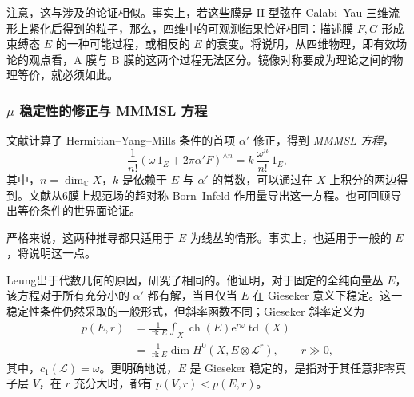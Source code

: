 注意，这与涉及的论证相似。事实上，若这些膜是 II 型弦在 Calabi--Yau 三维流形上紧化后得到的粒子，那么，四维中的可观测结果恰好相同：描述膜 $F,G$ 形成束缚态 $E$ 的一种可能过程，或相反的 $E$ 的衰变。将说明，从四维物理，即有效场论的观点看，A 膜与 B 膜的这两个过程无法区分。镜像对称要成为理论之间的物理等价，就必须如此。

\subsubsection{\texorpdfstring{$\mu$}{mu} 稳定性的修正与 MMMSL 方程}\label{sec:5.2.2.2}

文献计算了 Hermitian--Yang--Mills 条件的首项 $\alpha'$ 修正，得到 \emph{MMMSL 方程}，
\begin{equation}\label{eq:5.38}
\frac{1}{n!}(\omega\,1_E+2\pi\alpha'F)^{\wedge n}
=k\,\frac{\omega^n}{n!}\,1_E,
\end{equation}
其中，$n=\dim_{\mathbb C}X$，$k$ 是依赖于 $E$ 与 $\alpha'$ 的常数，可以通过在 $X$ 上积分的两边得到。文献从6膜上规范场的超对称 Born--Infeld 作用量导出这一方程。也可回顾导出等价条件的世界面论证。

严格来说，这两种推导都只适用于 $E$ 为线丛的情形。事实上，也适用于一般的 $E$，将说明这一点。

Leung出于代数几何的原因，研究了相同的。他证明，对于固定的全纯向量丛 $E$，该方程对于所有充分小的 $\alpha'$ 都有解，当且仅当 $E$ 在 Gieseker 意义下稳定。这一稳定性条件仍然采取的一般形式，但斜率函数不同；Gieseker 斜率定义为
\begin{equation}\label{eq:5.39}
\begin{aligned}
p(E,r)&=\frac{1}{\operatorname{rk}E}\int_X
\operatorname{ch}(E)\mathrm{e}^{r\omega}\operatorname{td}(X)\\
&=\frac{1}{\operatorname{rk}E}\dim H^0(X,E\otimes\mathcal{L}^r),\qquad r\gg0,
\end{aligned}
\end{equation}
其中，$c_1(\mathcal{L})=\omega$。更明确地说，$E$ 是 Gieseker 稳定的，是指对于其任意非零真子层 $V$，在 $r$ 充分大时，都有 $p(V,r)<p(E,r)$。

